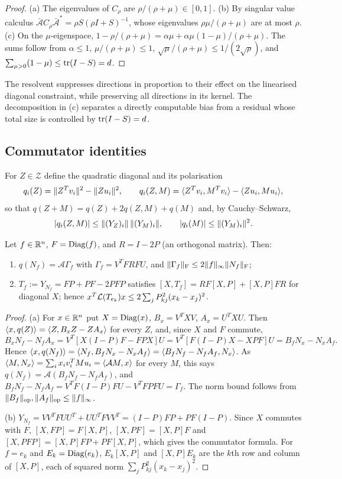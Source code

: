 \begin{proof}
(a) The eigenvalues of $C_\rho$ are $\rho/(\rho+\mu)\in[0,1]$. (b) By
singular value calculus $\bar{\mathcal A}C_\rho\bar{\mathcal A}^*=\rho S(\rho
I+S)^{-1}$, whose eigenvalues $\rho\mu/(\rho+\mu)$ are at most $\rho$. (c)
On the $\mu$-eigenspace,
$1-\rho/(\rho+\mu)=\alpha\mu+\alpha\mu(1-\mu)/(\rho+\mu)$.
The sums follow from $\alpha\le1$, $\mu/(\rho+\mu)\le1$,
$\sqrt\mu/(\rho+\mu)\le1/(2\sqrt\rho)$, and
$\sum_{\mu>0}(1-\mu)\le\operatorname{tr}(I-S)=d$.
\end{proof}

The resolvent suppresses directions in proportion to their effect on the
linearised diagonal constraint, while preserving all directions in its kernel.
The decomposition in (c) separates a directly computable bias from a residual
whose total size is controlled by $\operatorname{tr}(I-S)=d$.

\subsection{Commutator identities}

For $Z\in\mathcal Z$ define the quadratic diagonal and its polarisation
\[
 q_i(Z)=\lVert Z^Tv_i\rVert^2-\lVert Zu_i\rVert^2,\qquad
 q_i(Z,M)=\langle Z^Tv_i,M^Tv_i\rangle-\langle Zu_i,Mu_i\rangle,
\]
so that $q(Z+M)=q(Z)+2q(Z,M)+q(M)$ and, by Cauchy--Schwarz,
\begin{equation}\label{eq:q-cs}
 |q_i(Z,M)|\le\lVert (Y_Z)_i\rVert\,\lVert (Y_M)_i\rVert,\qquad |q_i(M)|\le\lVert (Y_M)_i\rVert^2 .
\end{equation}

\begin{lemma}\label{lem:commutator}
Let $f\in\mathbb R^n$, $F=\operatorname{Diag}(f)$, and $R=I-2P$ (an orthogonal matrix). Then:
\begin{enumerate}[label=(\alph*)]
\item $q(N_f)=\mathcal A\Gamma_f$ with $\Gamma_f=V^TFRFU$, and
$\lVert \Gamma_f\rVert_{\mathrm F}\le2\lVert f\rVert_\infty\lVert N_f\rVert_{\mathrm F}$;
\item $T_f:=Y_{N_f}=FP+PF-2PFP$ satisfies
$[X,T_f]=RF[X,P]+[X,P]FR$ for diagonal $X$; hence
$x^T\mathcal L(T_{e_k})x\le2\sum_jP_{kj}^2(x_k-x_j)^2$.
\end{enumerate}
\end{lemma}

\begin{proof}
(a) For $x\in\mathbb R^n$ put $X=\operatorname{Diag}(x)$, $B_x=V^TXV$, $A_x=U^TXU$. Then
$\langle x,q(Z)\rangle=\langle Z,B_xZ-ZA_x\rangle$ for every $Z$, and, since $X$ and $F$ commute,
\[
 B_xN_f-N_fA_x=V^T[X(I-P)F-FPX]U=V^T[F(I-P)X-XPF]U=B_fN_x-N_xA_f .
\]
Hence $\langle x,q(N_f)\rangle=\langle N_f,B_fN_x-N_xA_f\rangle=\langle B_fN_f-N_fA_f,N_x\rangle$. As
$\langle M,N_x\rangle=\sum_ix_iv_i^TMu_i=\langle \mathcal AM,x\rangle$ for every $M$, this says
$q(N_f)=\mathcal A(B_fN_f-N_fA_f)$, and
$B_fN_f-N_fA_f=V^TF(I-P)FU-V^TFPFU=\Gamma_f$. The norm bound follows from
$\lVert B_f\rVert_{\mathrm{op}},\lVert A_f\rVert_{\mathrm{op}}\le\lVert f\rVert_\infty$.

(b) $Y_{N_f}=VV^TFUU^T+UU^TFVV^T=(I-P)FP+PF(I-P)$. Since $X$ commutes with $F$,
$[X,FP]=F[X,P]$, $[X,PF]=[X,P]F$ and $[X,PFP]=[X,P]FP+PF[X,P]$, which gives the
commutator formula. For $f=e_k$ and $E_k=\operatorname{Diag}(e_k)$, $E_k[X,P]$ and $[X,P]E_k$ are
the $k$th row and column of $[X,P]$, each of squared norm
$\sum_jP_{kj}^2(x_k-x_j)^2$.
\end{proof}

